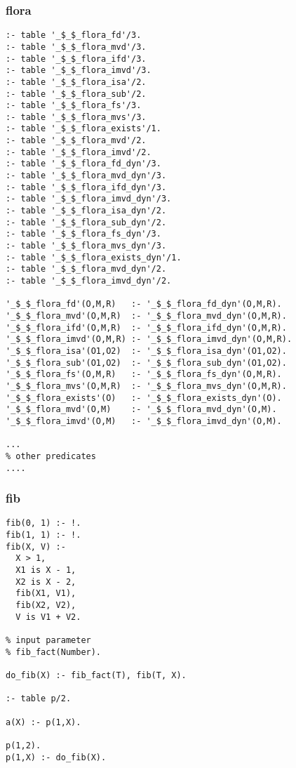 \subsubsection*{flora}

\begin{Verbatim}
:- table '_$_$_flora_fd'/3.
:- table '_$_$_flora_mvd'/3.
:- table '_$_$_flora_ifd'/3.
:- table '_$_$_flora_imvd'/3.
:- table '_$_$_flora_isa'/2.
:- table '_$_$_flora_sub'/2.
:- table '_$_$_flora_fs'/3.
:- table '_$_$_flora_mvs'/3.
:- table '_$_$_flora_exists'/1.
:- table '_$_$_flora_mvd'/2.
:- table '_$_$_flora_imvd'/2.
:- table '_$_$_flora_fd_dyn'/3.
:- table '_$_$_flora_mvd_dyn'/3.
:- table '_$_$_flora_ifd_dyn'/3.
:- table '_$_$_flora_imvd_dyn'/3.
:- table '_$_$_flora_isa_dyn'/2.
:- table '_$_$_flora_sub_dyn'/2.
:- table '_$_$_flora_fs_dyn'/3.
:- table '_$_$_flora_mvs_dyn'/3.
:- table '_$_$_flora_exists_dyn'/1.
:- table '_$_$_flora_mvd_dyn'/2.
:- table '_$_$_flora_imvd_dyn'/2.

'_$_$_flora_fd'(O,M,R)   :- '_$_$_flora_fd_dyn'(O,M,R).
'_$_$_flora_mvd'(O,M,R)  :- '_$_$_flora_mvd_dyn'(O,M,R).
'_$_$_flora_ifd'(O,M,R)  :- '_$_$_flora_ifd_dyn'(O,M,R).
'_$_$_flora_imvd'(O,M,R) :- '_$_$_flora_imvd_dyn'(O,M,R).
'_$_$_flora_isa'(O1,O2)  :- '_$_$_flora_isa_dyn'(O1,O2).
'_$_$_flora_sub'(O1,O2)  :- '_$_$_flora_sub_dyn'(O1,O2).
'_$_$_flora_fs'(O,M,R)   :- '_$_$_flora_fs_dyn'(O,M,R).
'_$_$_flora_mvs'(O,M,R)  :- '_$_$_flora_mvs_dyn'(O,M,R).
'_$_$_flora_exists'(O)   :- '_$_$_flora_exists_dyn'(O).
'_$_$_flora_mvd'(O,M)    :- '_$_$_flora_mvd_dyn'(O,M).
'_$_$_flora_imvd'(O,M)   :- '_$_$_flora_imvd_dyn'(O,M).

...
% other predicates
....
\end{Verbatim}

\subsubsection*{fib}

\begin{Verbatim}
fib(0, 1) :- !.
fib(1, 1) :- !.
fib(X, V) :-
  X > 1,
  X1 is X - 1,
  X2 is X - 2,
  fib(X1, V1),
  fib(X2, V2),
  V is V1 + V2.

% input parameter  
% fib_fact(Number).
    
do_fib(X) :- fib_fact(T), fib(T, X).

:- table p/2.

a(X) :- p(1,X).

p(1,2).
p(1,X) :- do_fib(X).
\end{Verbatim}

